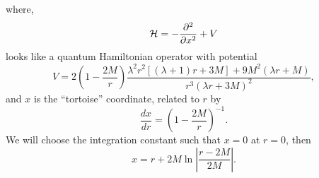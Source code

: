 \documentclass[aps,floats,showpacs,amssymb,tightenlines]{revtex4}
\begin{document}
where,
\begin{equation} \label{scho}
{\cal H} = -\frac{\partial^2 }{\partial x^2} +V
\end{equation}
looks like a  quantum Hamiltonian operator  with potential
\begin{equation}
\label{poten1}
V = 2 \left(1 -\frac{2 M}{ r}\right) {\frac{ \lambda^2 r^2
\left[(\lambda+1) r + 3 M \right] + 9 M^2 (\lambda r +M)}{ r^3
(\lambda r + 3 M)^2} } ,
\end{equation}
and $x$ is the ``tortoise'' coordinate, related to $r$ by
\begin{equation}
\label{tor}
\frac{dx}{dr}=\left(1-\frac{2M}{r}\right)^{-1}.
\end{equation}
We will choose the integration constant such that $x=0$ at $r=0$, then
\begin{equation}\label{tortu}
x = r +2 M \ln \left| \frac{r-2M}{2M}\right|.
\end{equation}
\end{document}
